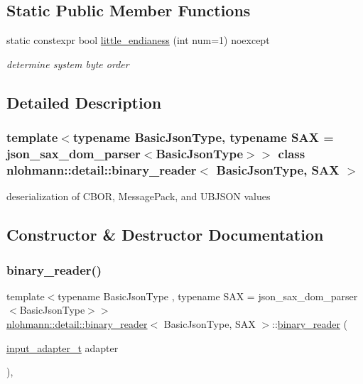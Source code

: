 \subsection*{Static Public Member Functions}
\begin{DoxyCompactItemize}
\item 
static constexpr bool \mbox{\hyperlink{classnlohmann_1_1detail_1_1binary__reader_a1e31dbfcf9567c8c2d4f0e4eb1b0230a}{little\+\_\+endianess}} (int num=1) noexcept
\begin{DoxyCompactList}\small\item\em determine system byte order \end{DoxyCompactList}\end{DoxyCompactItemize}


\subsection{Detailed Description}
\subsubsection*{template$<$typename Basic\+Json\+Type, typename S\+AX = json\+\_\+sax\+\_\+dom\+\_\+parser$<$\+Basic\+Json\+Type$>$$>$\newline
class nlohmann\+::detail\+::binary\+\_\+reader$<$ Basic\+Json\+Type, S\+A\+X $>$}

deserialization of C\+B\+OR, Message\+Pack, and U\+B\+J\+S\+ON values 

\subsection{Constructor \& Destructor Documentation}
\mbox{\label{classnlohmann_1_1detail_1_1binary__reader_aed84f0302eb232d3b69f7653bef2337a}} 
\subsubsection{\texorpdfstring{binary\+\_\+reader()}{binary\_reader()}}
{\footnotesize\ttfamily template$<$typename Basic\+Json\+Type , typename S\+AX  = json\+\_\+sax\+\_\+dom\+\_\+parser$<$\+Basic\+Json\+Type$>$$>$ \\
\mbox{\hyperlink{classnlohmann_1_1detail_1_1binary__reader}{nlohmann\+::detail\+::binary\+\_\+reader}}$<$ Basic\+Json\+Type, S\+AX $>$\+::\mbox{\hyperlink{classnlohmann_1_1detail_1_1binary__reader}{binary\+\_\+reader}} (\begin{DoxyParamCaption}\item[{\mbox{\hyperlink{namespacenlohmann_1_1detail_ae132f8cd5bb24c5e9b40ad0eafedf1c2}{input\+\_\+adapter\+\_\+t}}}]{adapter }\end{DoxyParamCaption})\hspace{0.3cm}{\ttfamily [inline]}, {\ttfamily [explicit]}}



